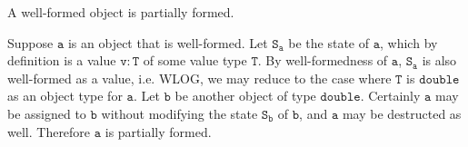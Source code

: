 \begin{Lemma}
    A well-formed object is partially formed.
\end{Lemma}

\begin{solution}
    Suppose $\mathtt{a}$ is an object that is well-formed. Let $\mathtt{S_{a}}$ 
    be the state of $\mathtt{a}$, which by definition is a value $\mathtt{v : T}$ of 
    some value type $\mathtt{T}$. By well-formedness of $\mathtt{a}$, $\mathtt{S_{a}}$ is 
    also well-formed as a value, i.e. WLOG, we may reduce to the case where 
    $\mathtt{T}$ is $\mathtt{double}$ as an object type for $\mathtt{a}$. Let $\mathtt{b}$ 
    be another object of type $\mathtt{double}$. Certainly $\mathtt{a}$ may be assigned to 
    $\mathtt{b}$ without modifying the state $\mathtt{S_{b}}$ of $\mathtt{b}$, and 
    $\mathtt{a}$ may be destructed as well. Therefore $\mathtt{a}$ is partially formed.
\end{solution}